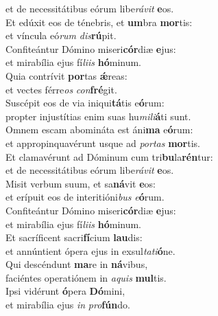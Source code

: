 \oddverse et de necessitátibus eórum libe\textit{rá}\textit{vit} \textbf{e}os.\\
\evenverse Et edúxit eos de ténebris, et \textbf{um}bra \textbf{mor}tis:~\*\\
\evenverse et víncula eó\textit{rum} \textit{dis}\textbf{rú}pit.\\
\oddverse Confiteántur Dómino miseri\textbf{cór}diæ \textbf{e}jus:~\*\\
\oddverse et mirabília ejus fí\textit{li}\textit{is} \textbf{hó}minum.\\
\evenverse Quia contrívit \textbf{por}tas \textbf{ǽ}reas:~\*\\
\evenverse et vectes férre\textit{os} \textit{con}\textbf{fré}git.\\
\oddverse Suscépit eos de via iniqui\textbf{tá}tis e\textbf{ó}rum:~\*\\
\oddverse propter injustítias enim suas hu\textit{mi}\textit{li}\textbf{á}ti sunt.\\
\evenverse Omnem escam abomináta est áni\textbf{ma} e\textbf{ó}rum:~\*\\
\evenverse et appropinquavérunt usque ad \textit{por}\textit{tas} \textbf{mor}tis.\\
\oddverse Et clamavérunt ad Dóminum cum tri\textbf{bu}la\textbf{rén}tur:~\*\\
\oddverse et de necessitátibus eórum libe\textit{rá}\textit{vit} \textbf{e}os.\\
\evenverse Misit verbum suum, et sa\textbf{ná}vit \textbf{e}os:~\*\\
\evenverse et erípuit eos de interitióni\textit{bus} \textit{e}\textbf{ó}rum.\\
\oddverse Confiteántur Dómino miseri\textbf{cór}diæ \textbf{e}jus:~\*\\
\oddverse et mirabília ejus fí\textit{li}\textit{is} \textbf{hó}minum.\\
\evenverse Et sacríficent sacri\textbf{fí}cium \textbf{lau}dis:~\*\\
\evenverse et annúntient ópera ejus in exsul\textit{ta}\textit{ti}\textbf{ó}ne.\\
\oddverse Qui descéndunt \textbf{ma}re in \textbf{ná}vibus,~\*\\
\oddverse faciéntes operatiónem in \textit{a}\textit{quis} \textbf{mul}tis.\\
\evenverse Ipsi vidérunt \textbf{ó}pera \textbf{Dó}mini,~\*\\
\evenverse et mirabília ejus \textit{in} \textit{pro}\textbf{fún}do.\\

